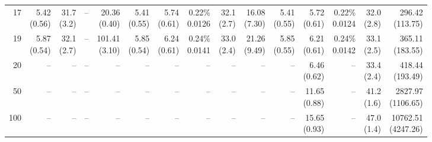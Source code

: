 \documentclass[11pt]{article}
\theoremstyle{plain}
\theoremstyle{definition}
\begin{document}
\begin{landscape}
\begin{table}
{\begin{tabular}{r|rrrr|rrrrr|rrrrr}
 				17 & \makecell{5.42\\ (0.56)} & \makecell{31.7\\ (3.2)} & -- & \makecell{20.36\\ (0.40)} & \makecell{5.41\\ (0.55)} & \makecell{5.74\\ (0.61)} & \makecell{0.22\% \\ 0.0126} & \makecell{32.1\\ (2.7)} & \makecell{16.08\\ (7.30)} & \makecell{5.41\\ (0.55)} & \makecell{5.72\\ (0.61)} & \makecell{0.22\% \\ 0.0124} & \makecell{32.0\\ (2.8)} & \makecell{296.42\\ (113.75)} \\
 				19 & \makecell{5.87\\ (0.54)} & \makecell{32.1\\ (2.7)} & -- & \makecell{101.41\\ (3.10)} & \makecell{5.85\\ (0.54)} & \makecell{6.24\\ (0.61)} & \makecell{0.24\% \\ 0.0141} & \makecell{33.0\\ (2.4)} & \makecell{21.26\\ (9.49)} & \makecell{5.85\\ (0.55)} & \makecell{6.21\\ (0.61)} & \makecell{0.24\% \\ 0.0142} & \makecell{33.1\\ (2.5)} & \makecell{365.11\\ (183.55)} \\
 				20 & -- & -- & -- & -- & -- & -- & -- & -- & -- & -- & \makecell{6.46\\ (0.62)} & -- & \makecell{33.4\\ (2.4)} & \makecell{418.44\\ (193.49)} \\
 				50 & -- & -- & -- & -- & -- & -- & -- & -- & -- & -- & \makecell{11.65\\ (0.88)} & -- & \makecell{41.2\\ (1.6)} & \makecell{2827.97\\ (1106.65)} \\
 				100 & -- & -- & -- & -- & -- & -- & -- & -- & -- & -- & \makecell{15.65\\ (0.93)} & -- & \makecell{47.0\\ (1.4)} & \makecell{10762.51\\ (4247.26)} \\

\end{tabular}}
\end{table}
\end{landscape}
\end{document}
